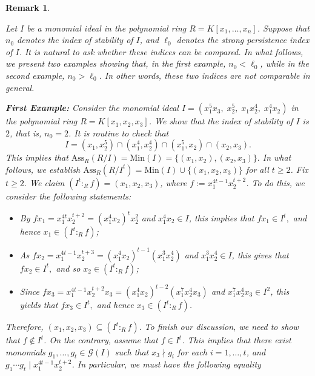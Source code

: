 \documentclass[11pt]{amsart}
\newtheorem{remark}[theorem]{Remark}
\begin{document}

\begin{remark} \label{Compare}
\em{
Let \( I \) be a monomial ideal in the polynomial ring 
\( R = K[x_1, \ldots, x_n] \). Suppose that \( n_0 \) denotes the 
index of stability of \( I \), and \( \ell_0 \) denotes the strong 
persistence index of \( I \). It is natural to ask whether these 
indices can be compared. In what follows, we present two examples 
showing that, in the first example, \( n_0 < \ell_0 \), while in the 
second example, \( n_0 > \ell_0 \). In other words, these two indices 
are not comparable in general.

\medskip
\textbf{First Example:} 
Consider the monomial ideal $I = (x_1^5 x_3,\; x_2^5,\; x_1 x_2^4,\; x_1^4 x_2)$ in the polynomial ring 
$R=K[x_1, x_2, x_3]$. We show that  the  index of stability of  $I$ is $2$, that is, $n_0=2$. It is routine to check that 
 $$I=(x_1, x_2^5) \cap (x_1^4, x_2^4) \cap (x_1^5, x_2) \cap (x_2, x_3).$$ 
This implies that $\mathrm{Ass}_R(R/I)=\mathrm{Min}(I)=\{(x_1, x_2),     (x_2, x_3)\}.$
In what follows, we establish  $\mathrm{Ass}_R(R/I^t)=\mathrm{Min}(I) \cup
\{(x_1, x_2, x_3)\}$ for all $t\geq 2$. Fix $t\geq 2$.  We claim $(I^t:_R f)=(x_1, x_2, x_3)$, where $f:=x_1^{4t-1} x_2^{t+2}$. To do this, we   consider the following statements:
\begin{itemize}
\item[(i)] By   $fx_1=x_1^{4t}x_2^{t+2}=(x_1^4x_2)^tx_2^2$ and $x_1^4x_2\in I$, this implies that  $fx_1\in I^t,$ and hence  $x_1 \in (I^t:_Rf)$;
\item[(ii)] As  $fx_2=x_1^{4t-1}x_2^{t+3}=(x_1^4x_2)^{t-1} (x_1^3x_2^4)$ and $x_1^3x_2^4\in I$, this gives that  $fx_2 \in I^t,$ and so   $x_2 \in (I^t:_Rf)$;
\item[(iii)] Since  $fx_3=x_1^{4t-1}x_2^{t+2}x_3 =(x_1^4x_2)^{t-2}(x_1^7x_2^4x_3)$ and $x_1^7x_2^4x_3\in I^2$, this yields that  $fx_3 \in I^t,$ 
and hence  $x_3 \in (I^t:_Rf)$.
\end{itemize} 
    Therefore,  $(x_1, x_2, x_3) \subseteq (I^t:_Rf).$ To finish our discussion,  we need to show that   $f\notin I^t$. On the contrary, assume that  $f \in I^t$. 
    This implies that there exist monomials $g_1, \ldots, g_t \in \mathcal{G}(I)$ such that   $x_3\nmid g_i$ for each $i=1, \ldots, t$, and  
    $g_1 \cdots g_t \mid   x_1^{4t-1} x_2^{t+2}$.   In particular, we must have the following equality
\begin{equation}

\end{equation}}
\end{remark}
\end{document}
